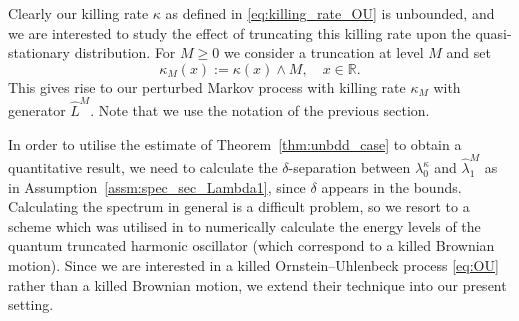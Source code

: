 \documentclass{aptpub}
\newcommand{\R}{\mathbb R}
\newcommand{\lkap}{\lambda_0^\kappa}
\begin{document}
Clearly our killing rate $\kappa$ as defined in \eqref{eq:killing_rate_OU} is unbounded, and we are interested to study the effect of truncating this killing rate upon the quasi-stationary distribution. 
For $M\geq 0$ we consider a truncation at level $M$ and set
\begin{equation*}
    \kappa_M(x) := \kappa(x) \wedge M, \quad x\in\R.
\end{equation*}
This gives rise to our perturbed Markov process with killing rate $\kappa_M$ with generator $\widehat{L}^M$. Note that we use the notation of the previous section.

In order to utilise 
the estimate of Theorem~\ref{thm:unbdd_case}
to obtain a quantitative result, we need to calculate the $\delta$-separation between $\lkap$ and $\widehat \lambda_1^M$ as in Assumption~\ref{assm:spec_sec_Lambda1}, since $\delta$ appears in the bounds. 
Calculating the spectrum in general is a difficult problem, so we resort to a scheme which was utilised in \cite{Mielnik1996} to numerically calculate the energy levels of the quantum truncated harmonic oscillator (which correspond to a killed Brownian motion). Since we are interested in a killed Ornstein--Uhlenbeck process \eqref{eq:OU} rather than a killed Brownian motion, we extend their technique into our present setting.
\end{document}
